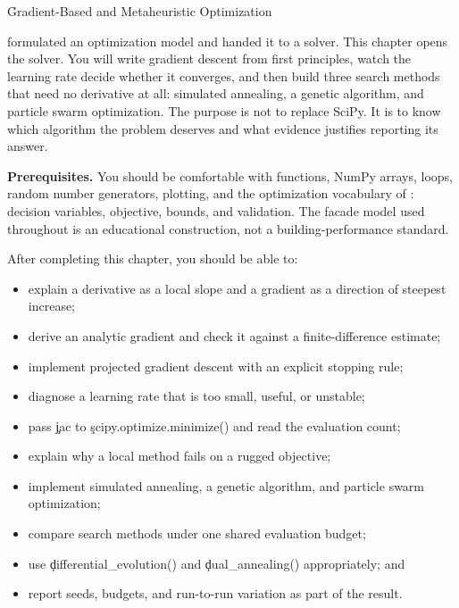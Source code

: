 
\h{Gradient-Based and Metaheuristic Optimization}
\label{ch:19}

 formulated an optimization model and handed it to a
solver. This chapter opens the solver. You will write gradient descent from
first principles, watch the learning rate decide whether it converges, and then
build three search methods that need no derivative at all: simulated annealing,
a genetic algorithm, and particle swarm optimization. The purpose is not to
replace SciPy. It is to know which algorithm the problem deserves and what
evidence justifies reporting its answer.

\begin{NoteBox}
\textbf{Prerequisites.} You should be comfortable with functions, NumPy arrays,
loops, random number generators, plotting, and the optimization vocabulary of
: decision variables, objective, bounds, and
validation. The facade model used throughout is an educational construction,
not a building-performance standard.
\end{NoteBox}

\begin{tcolorbox}[title=Learning outcomes,colframe=orange,colback=white,arc=2mm]
After completing this chapter, you should be able to:
\begin{itemize}
    \item explain a derivative as a local slope and a gradient as a direction of steepest increase;
    \item derive an analytic gradient and check it against a finite-difference estimate;
    \item implement projected gradient descent with an explicit stopping rule;
    \item diagnose a learning rate that is too small, useful, or unstable;
    \item pass \c{jac} to \c{scipy.optimize.minimize()} and read the evaluation count;
    \item explain why a local method fails on a rugged objective;
    \item implement simulated annealing, a genetic algorithm, and particle swarm optimization;
    \item compare search methods under one shared evaluation budget;
    \item use \c{differential_evolution()} and \c{dual_annealing()} appropriately; and
    \item report seeds, budgets, and run-to-run variation as part of the result.
\end{itemize}
\end{tcolorbox}

